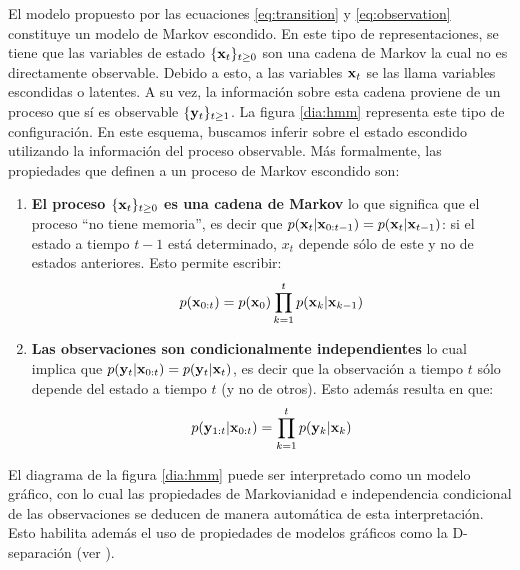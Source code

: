 El modelo propuesto por las ecuaciones \ref{eq:transition} y \ref{eq:observation} constituye un modelo de Markov escondido. En este tipo de representaciones, se tiene que las variables de estado $\{\mathbf{x}_t\}_{t \ge 0}$ son una cadena de Markov la cual no es directamente observable. Debido a esto, a las variables $\mathbf{x}_t$ se las llama variables escondidas o latentes. A su vez, la información sobre esta cadena proviene de un proceso que sí es observable $\{\mathbf{y}_t\}_{t \ge 1}$. La figura \ref{dia:hmm} representa este tipo de configuración. En este esquema, buscamos inferir sobre el estado escondido utilizando la información del proceso observable. Más formalmente, las propiedades que definen a un proceso de Markov escondido son: 
\begin{enumerate}
    \item \textbf{El proceso $\{\mathbf{x}_t\}_{t \ge 0}$ es una cadena de Markov} lo que significa que el proceso ``no tiene memoria'', es decir que $p(\mathbf{x}_t | \mathbf{x}_{0:t-1}) = p(\mathbf{x}_t | \mathbf{x}_{t-1})$: si el estado a tiempo $t-1$ está determinado, $x_t$ depende sólo de este y no de estados anteriores. Esto permite escribir:
    \begin{align*}
        p(\mathbf{x}_{0:t}) = p(\mathbf{x}_0) \prod_{k=1}^{t} p(\mathbf{x}_k | \mathbf{x}_{k-1})
    \end{align*}
    \item \textbf{Las observaciones son condicionalmente independientes}  lo cual implica que $p(\mathbf{y}_t | \mathbf{x}_{0:t}) = p(\mathbf{y}_t | \mathbf{x}_t)$, es decir que la observación a tiempo $t$ sólo depende del estado a tiempo $t$ (y no de otros). Esto además resulta en que:
    \begin{align*}
        p(\mathbf{y}_{1:t} | \mathbf{x}_{0:t}) = \prod_{k=1}^{t} p(\mathbf{y}_k | \mathbf{x}_k)
    \end{align*}
\end{enumerate}
El diagrama de la figura \ref{dia:hmm} puede ser interpretado como un modelo gráfico, con lo cual las propiedades de Markovianidad e independencia condicional de las observaciones se deducen de manera automática de esta interpretación. Esto habilita además el uso de propiedades de modelos gráficos como la D-separación (ver \cite{Jordan1999}).

